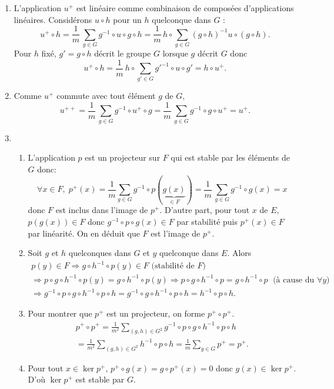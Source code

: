 \begin{enumerate}
  \item L'application $u^+$ est lin{\'e}aire comme combinaison de compos{\'e}es d'applications lin{\'e}aires. Consid{\'e}rons $u\circ h$ pour   un $h$ quelconque dans $G$ :
  \[
  u^+ \circ h = \frac{1}{m}\,\sum_{g\in G}g^{-1} \circ u \circ g \circ h 
  = \frac{1}{m}\,h \circ \sum_{g\in G}(g \circ h)^{-1}u \circ (g \circ h).
  \]
  Pour $h$ fix{\'e}, $g' = g \circ h$ d{\'e}crit le groupe $G$ lorsque $g$ d{\'e}crit $G$ donc
  \[
  u^+ \circ h = \frac{1}{m}\,h \circ \sum_{g'\in G}g'^{-1} \circ u \circ g' = h \circ u^+ .
  \]
  
  \item Comme $u^+$ commute avec tout {\'e}l{\'e}ment $g$ de $G$,
  \[
  u^{++} = \frac{1}{m}\,\sum_{g\in G}g^{-1} \circ u^+ \circ g = \frac{1}{m}\,\sum_{g\in G}g^{-1} \circ g \circ u^+ = u^+ .
  \]
  
  \item 
  \begin{enumerate} 
    \item L'application $p$ est un projecteur sur $F$ qui est stable par les {\'e}l{\'e}ments de $G$ donc:
  \[
\forall x \in F,\;  p^+(x) = \frac{1}{m}\sum_{g\in G}g^{-1} \circ p(\underset{\in F}{\underbrace{g(x)}}) = \frac{1}{m}\,\sum_{g\in G}g^{-1} \circ g(x) = x
  \]
  donc $F$ est inclus dans l'image de $p^+$.\newline
  D'autre part, pour tout $x$ de $E$, $p(g(x))\in F$ donc $g^{-1} \circ p \circ g(x)\in F$ par stabilit{\'e} puis $p^+(x)\in F$ par lin{\'e}arit{\'e}. On en d{\'e}duit que $F$ est l'image de $p^+$.
  
    \item Soit $g$ et $h$ quelconques dans $G$ et $y$ quelconque dans $E$. Alors 
\begin{multline*}
 p(y)\in F \Rightarrow g \circ h^{-1} \circ p(y)\in F \text{ (stabilité de $F$)} \\
 \Rightarrow p \circ g \circ h^{-1} \circ p(y) = g \circ h^{-1} \circ p(y) 
 \Rightarrow p \circ g \circ h^{-1} \circ p = g \circ h^{-1} \circ p \; \text{ (à cause du $\forall y$})\\
 \Rightarrow g^{-1} \circ p \circ g \circ h^{-1} \circ p \circ h = g^{-1} \circ g \circ h^{-1} \circ p \circ h = h^{-1} \circ p \circ h.
\end{multline*}
  
    \item Pour montrer que $p^+$ est un projecteur, on forme $p^+ \circ p^+$.
  \begin{multline*}
  p^+ \circ p^+ 
  = \frac{1}{m^2}\sum_{(g,h)\in G^2}g^{-1} \circ p \circ g \circ h^{-1} \circ p \circ h \\
  = \frac{1}{m^2}\sum_{(g,h)\in G^2}h^{-1} \circ p \circ h
  = \frac{1}{m}\sum_{g\in G}p^+ = p^+.
  \end{multline*}
  
    \item Pour tout $x \in \ker p^+$, $p^+ \circ g(x) = g  \circ p^+(x) = 0$ donc $g(x) \in \ker p^+$. D'où $\ker p^+$ est stable par $G$.
  \end{enumerate}
\end{enumerate}
